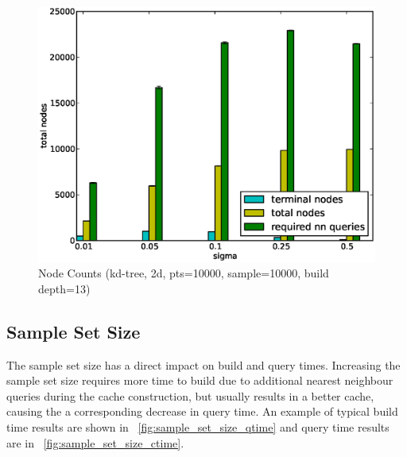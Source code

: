 \documentclass[mcs]{scsthesis}
\begin{document}
\begin{figure}
\begin{center}
\includegraphics[scale=0.5]{diagrams/2d_pts10000_sample10000_builddata.eps}
\caption{Node Counts (kd-tree, 2d, pts=10000, sample=10000, build depth=13)}
\label{fig:node_counts}
\end{center}
\end{figure}

\subsection{Sample Set Size}

The sample set size has a direct impact on build and query times. Increasing
the sample set size requires more time to build due to additional nearest
neighbour queries during the cache construction, but usually results in a
better cache, causing the a corresponding decrease in query time.  An example
of typical build time results are shown in ~\ref{fig:sample_set_size_qtime}
and query time results are in ~\ref{fig:sample_set_size_ctime}.
\end{document}
